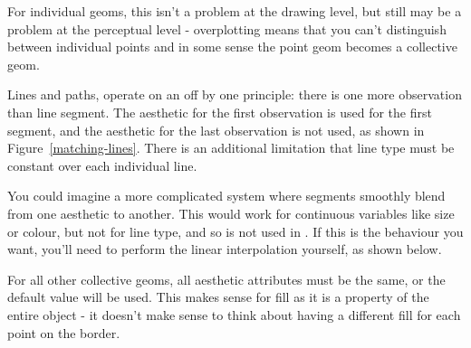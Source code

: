 
For individual geoms, this isn't a problem at the drawing level, but still may be a problem at the perceptual level - overplotting means that you can't distinguish between individual points and in some sense the point geom becomes a collective geom.

Lines and paths, operate on an off by one principle: there is one more observation than line segment.   The aesthetic for the first observation is used for the first segment, and the aesthetic for the last observation is not used, as shown in Figure~\ref{matching-lines}.  There is an additional limitation that line type must be constant over each individual line.

% 


You could imagine a more complicated system where segments smoothly blend from one aesthetic to another.  This would work for continuous variables like size or colour, but not for line type, and so is not used in \ggplot.  If this is the behaviour you want, you'll need to perform the linear interpolation yourself, as shown below.  

% 


For all other collective geoms, all aesthetic attributes must be the same, or the default value will be used.  This makes sense for fill as it is a property of the entire object - it doesn't make sense to think about having a different fill for each point on the border.


